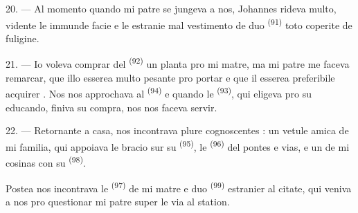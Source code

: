 \VUsaut{3.0mm}

20. --- Al momento quando mi patre se jungeva a nos, Johannes rideva multo,
vidente le immunde facie e le estranie mal vestimento de duo  \textsuperscript{(91)} toto coperite de fuligine.

21. --- Io voleva comprar del 
\textsuperscript{(92)} un planta pro mi matre, ma mi patre me faceva remarcar, que
illo esserea multo pesante pro portar e que il esserea preferibile acquirer
. Nos nos approchava al 
\textsuperscript{(94)} e quando le  \textsuperscript{(93)},
qui eligeva pro su educando, finiva su compra, nos nos faceva servir.

22. --- Retornante a casa, nos incontrava plure cognoscentes : un vetule amica de
mi familia, qui appoiava le bracio sur su 
\textsuperscript{(95)}, le  \textsuperscript{(96)} del pontes e
vias, e un de mi cosinas con su 
\textsuperscript{(98)}.

Postea nos incontrava le  \textsuperscript{(97)} de mi matre e duo
 \textsuperscript{(99)} estranier al citate, qui veniva a nos pro
questionar mi patre super le via al station.
\VUsaut{6.0mm}
\VUfilet{22mm}
